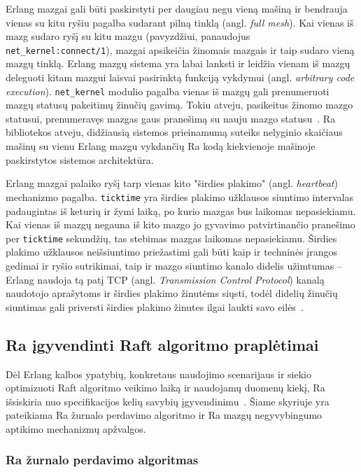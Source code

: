 \documentclass{VUMIFPSkursinis}
\begin{document}
Erlang mazgai gali būti paskirstyti per daugiau negu vieną mašiną ir bendrauja vienas su kitu ryšiu pagalba sudarant pilną tinklą (angl. \textit{full mesh}). Kai vienas iš mazg sudaro ryšį su kitu mazgu (pavyzdžiui, panaudojus \texttt{net\_kernel:connect/1}), mazgai apsikeičia žinomais mazgais ir taip sudaro vieną mazgų tinklą. Erlang mazgų sistema yra labai lanksti ir leidžia vienam iš mazgų deleguoti kitam mazgui laisvai pasirinktą funkciją vykdymui (angl. \textit{arbitrary code execution}). \texttt{net\_kernel} modulio pagalba vienas iš mazgų gali prenumeruoti mazgų statusų pakeitimų žinučių gavimą. Tokiu atveju, pasikeitus žinomo mazgo statusui, prenumeravęs mazgas gaus pranešimą su nauju mazgo statusu~\cite{erlang_distributed, hebert_learn_2013}. Ra bibliotekos atveju, didžiausią sistemos prieinamumą suteiks nelyginio skaičiaus mašinų su vienu Erlang mazgu vykdančių Ra kodą kiekvienoje mašinoje paskirstytos sistemos architektūra.

Erlang mazgai palaiko ryšį tarp vienas kito "širdies plakimo" (angl. \emph{heartbeat}) mechanizmo pagalba. \texttt{ticktime} yra širdies plakimo užklausos siuntimo intervalas padaugintas iš keturių ir žymi laiką, po kurio mazgas bus laikomas nepasiekiamu. Kai vienas iš mazgų negauna iš kito mazgo jo gyvavimo patvirtinančio pranešimo per \texttt{ticktime} sekundžių, tas stebimas mazgas laikomas nepasiekiamu. Širdies plakimo užklausos neišsiuntimo priežastimi gali būti kaip ir techninės įrangos gedimai ir ryšio sutrikimai, taip ir mazgo siuntimo kanalo didelis užimtumas -- Erlang naudoja tą patį TCP (angl. \emph{Transmission Control Protocol}) kanalą naudotojo aprašytoms ir širdies plakimo žinutėms siųsti, todėl didelių žinučių siuntimas gali priversti širdies plakimo žinutes ilgai laukti savo eilės~\cite{hebert_learn_2013}.

\subsection{Ra įgyvendinti Raft algoritmo praplėtimai}

Dėl Erlang kalbos ypatybių, konkretaus naudojimo scenarijaus ir siekio optimizuoti Raft algoritmo veikimo laiką ir naudojamų duomenų kiekį, Ra išsiskiria nuo specifikacijos kelių savybių įgyvendinimu~\cite{rabbitmqra}. Šiame skyriuje yra pateikiama Ra žurnalo perdavimo algoritmo ir Ra mazgų negyvybingumo aptikimo mechanizmų apžvalgos. 

\subsubsection{Ra žurnalo perdavimo algoritmas}
\end{document}
